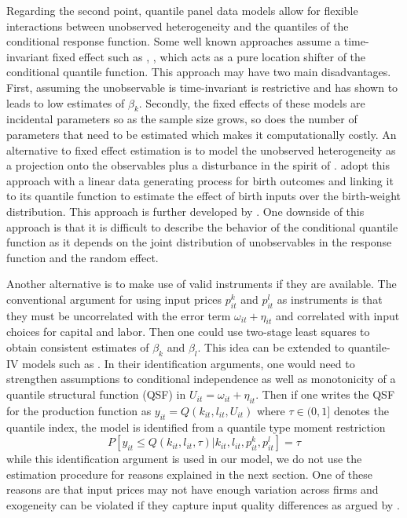 \documentclass[11pt]{article}
\begin{document}
Regarding the second point, quantile panel data models allow for flexible interactions between unobserved heterogeneity and the quantiles of the conditional response function. Some well known approaches assume a time-invariant fixed effect such as \cite{Koenker2004}, \cite{Lamarche2010}, \cite{Canay2011} which acts as a pure location shifter of the conditional quantile function. This approach may have two main disadvantages. First, assuming the unobservable is time-invariant is restrictive and \cite{Griliches1986} has shown to leads to low estimates of $\beta_{k}$. Secondly, the fixed effects of these models are incidental parameters so as the sample size grows, so does the number of parameters that need to be estimated which makes it computationally costly. An alternative to fixed effect estimation is to model the unobserved heterogeneity as a projection onto the observables plus a disturbance in the spirit of \cite{Chamberlain1984}. \cite{Abrevaya2008} adopt this approach with a linear data generating process for birth outcomes and linking it to its quantile function to estimate the effect of birth inputs over the birth-weight distribution. This approach is further developed by \cite{Bache2012}. One downside of this approach is that it is difficult to describe the behavior of the conditional quantile function as it depends on the joint distribution of unobservables in the response function and the random effect.

Another alternative is to make use of valid instruments if they are available. The conventional argument for using input prices $p^{k}_{it}$ and $p^{l}_{it}$ as instruments is that they must be uncorrelated with the error term $\omega_{it}+\eta_{it}$ and correlated with input choices for capital and labor. Then one could use two-stage least squares to obtain consistent estimates of $\beta_{k}$ and $\beta_{l}$. This idea can be extended to quantile-IV models such as \cite{Chernozhukov2005}. In their identification arguments, one would need to strengthen assumptions to conditional independence as well as monotonicity of a quantile structural function (QSF) in $U_{it}=\omega_{it}+\eta_{it}$. Then if one writes the QSF for the production function as $y_{it}=Q(k_{it}, l_{it}, U_{it})$ where $\tau\in (0,1]$ denotes the quantile index, the model is identified from a quantile type moment restriction
\begin{equation}
P[y_{it}\leq Q(k_{it}, l_{it}, \tau)|k_{it}, l_{it}, p^{k}_{it}, p^{l}_{it}]=\tau
\end{equation}
while this identification argument is used in our model, we do not use the estimation procedure for reasons explained in the next section. One of these reasons are that input prices may not have enough variation across firms and exogeneity can be violated if they capture input quality differences as argued by \cite{Griliches1986}.
\end{document}
